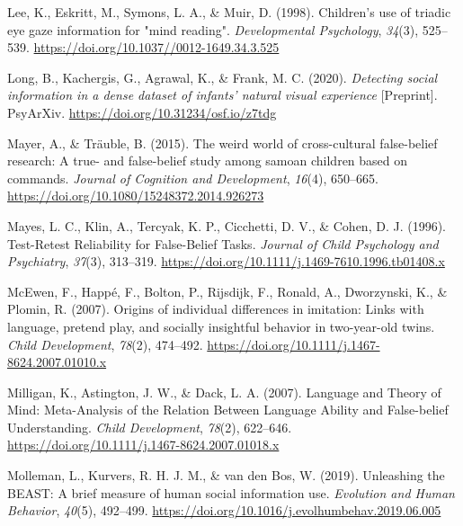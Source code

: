 \documentclass[
  man,floatsintext]{apa6}
\newlength{\cslhangindent}
\newlength{\cslentryspacingunit} %
\newenvironment{CSLReferences}[2] %
 {%
  \setlength{\parindent}{0pt}
  \ifodd #1
  \let\oldpar\par
  \def\par{\hangindent=\cslhangindent\oldpar}
  \fi
  \setlength{\parskip}{#2\cslentryspacingunit}
 }%
 {}
\begin{document}
\begin{CSLReferences}{1}{0}
\leavevmode{}%
Lee, K., Eskritt, M., Symons, L. A., \& Muir, D. (1998). Children's use of triadic eye gaze information for "mind reading". \emph{Developmental Psychology}, \emph{34}(3), 525--539. \url{https://doi.org/10.1037//0012-1649.34.3.525}

\leavevmode{}%
Long, B., Kachergis, G., Agrawal, K., \& Frank, M. C. (2020). \emph{Detecting social information in a dense dataset of infants' natural visual experience} {[}Preprint{]}. {PsyArXiv}. \url{https://doi.org/10.31234/osf.io/z7tdg}

\leavevmode{}%
Mayer, A., \& Träuble, B. (2015). The weird world of cross-cultural false-belief research: {A} true- and false-belief study among samoan children based on commands. \emph{Journal of Cognition and Development}, \emph{16}(4), 650--665. \url{https://doi.org/10.1080/15248372.2014.926273}

\leavevmode{}%
Mayes, L. C., Klin, A., Tercyak, K. P., Cicchetti, D. V., \& Cohen, D. J. (1996). Test-{Retest Reliability} for {False-Belief Tasks}. \emph{Journal of Child Psychology and Psychiatry}, \emph{37}(3), 313--319. \url{https://doi.org/10.1111/j.1469-7610.1996.tb01408.x}

\leavevmode{}%
McEwen, F., Happé, F., Bolton, P., Rijsdijk, F., Ronald, A., Dworzynski, K., \& Plomin, R. (2007). Origins of individual differences in imitation: Links with language, pretend play, and socially insightful behavior in two-year-old twins. \emph{Child Development}, \emph{78}(2), 474--492. \url{https://doi.org/10.1111/j.1467-8624.2007.01010.x}

\leavevmode{}%
Milligan, K., Astington, J. W., \& Dack, L. A. (2007). Language and {Theory} of {Mind}: {Meta-Analysis} of the {Relation Between Language Ability} and {False-belief Understanding}. \emph{Child Development}, \emph{78}(2), 622--646. \url{https://doi.org/10.1111/j.1467-8624.2007.01018.x}

\leavevmode{}%
Molleman, L., Kurvers, R. H. J. M., \& van den Bos, W. (2019). Unleashing the {BEAST}: A brief measure of human social information use. \emph{Evolution and Human Behavior}, \emph{40}(5), 492--499. \url{https://doi.org/10.1016/j.evolhumbehav.2019.06.005}


\end{CSLReferences}
\end{document}
